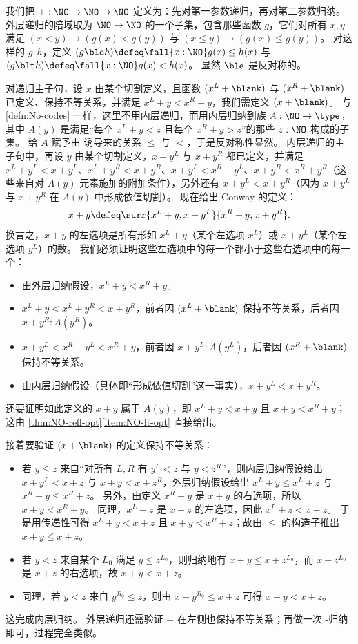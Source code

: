 \begin{eg}\label{eg:surreal-addition}
%
我们把 $\mathord+:\NO\to\NO\to\NO$ 定义为：先对第一参数递归，再对第二参数归纳。
外层递归的陪域取为 $\NO\to\NO$ 的一个子集，包含那些函数 $g$，它们对所有 $x,y$ 满足 $(x<y) \to (g(x)<g(y))$ 与 $(x\le y) \to (g(x)\le g(y))$。
对这样的 $g,h$，定义 $(g\ble h)\defeq \fall{x:\NO} g(x)\le h(x)$ 与 $(g\blt h)\defeq \fall{x:\NO} g(x)< h(x)$。
显然 $\ble$ 是反对称的。

对递归主子句，设 $x$ 由某个切割定义，且函数 $(x^L+\blank)$ 与 $(x^R+\blank)$ 已定义、保持不等关系，并满足 $x^L+y<x^R+y$，我们需定义 $(x+\blank)$。
与 \cref{defn:No-codes} 一样，这里不用内层递归，而用内层归纳到族 $A:\NO\to\type$，其中 $A(y)$ 是满足“每个 $x^L + y < z$ 且每个 $x^R + y > z$”的那些 $z:\NO$ 构成的子集。
给 $A$ 赋予由 \NO 诱导来的关系 $\le$ 与 $<$，于是反对称性显然。
内层递归的主子句中，再设 $y$ 由某个切割定义，$x+y^L$ 与 $x+y^R$ 都已定义，并满足 $x^L+y^L < x+y^L$、$x^L+y^R < x+y^R$、$x+y^L < x^R + y^L$、$x+y^R < x^R+y^R$（这些来自对 $A(y)$ 元素施加的附加条件），另外还有 $x+y^L < x+y^R$（因为 $x+y^L$ 与 $x+y^R$ 在 $A(y)$ 中形成依值切割）。
现在给出 Conway 的定义：
\[ x+y \defeq \surr{x^L+y, x+y^L}{x^R+y,x+y^R}. \]
换言之，$x+y$ 的左选项是所有形如 $x^L+y$（某个左选项 $x^L$）或 $x+y^L$（某个左选项 $y^L$）的数。
我们必须证明这些左选项中的每一个都小于这些右选项中的每一个：
\begin{itemize}
\item 由外层归纳假设，$x^L+y < x^R+y$。
\item $x^L+y < x^L + y^R < x + y^R$，前者因 $(x^L+\blank)$ 保持不等关系，后者因 $x+y^R : A(y^R)$。
\item $x+y^L < x^R+ y^L < x^R + y$，前者因 $x+y^L : A(y^L)$，后者因 $(x^R+\blank)$ 保持不等关系。
\item 由内层归纳假设（具体即“形成依值切割”这一事实），$x+y^L < x+y^R$。
\end{itemize}
还要证明如此定义的 $x+y$ 属于 $A(y)$，即 $x^L + y < x+y$ 且 $x+y < x^R + y$；这由 \cref{thm:NO-refl-opt}\ref{item:NO-lt-opt} 直接给出。

接着要验证 $(x+\blank)$ 的定义保持不等关系：
\begin{itemize}
\item 若 $y\le z$ 来自“对所有 $L,R$ 有 $y^L<z$ 与 $y<z^R$”，则内层归纳假设给出 $x+y^L<x+z$ 与 $x+y < x+z^R$，外层归纳假设给出 $x^L+y \le x^L+z$ 与 $x^R+ y \le x^R+z$。
  另外，由定义 $x^R+y$ 是 $x+y$ 的右选项，所以 $x+y < x^R+y$。
  同理，$x^L+z$ 是 $x+z$ 的左选项，因此 $x^L+z < x+z$。
  于是用传递性可得 $x^L+y < x+z$ 且 $x+y < x^R+z$；故由 $\le$ 的构造子推出 $x+y \le x+z$。
\item 若 $y<z$ 来自某个 $L_0$ 满足 $y\le z^{L_0}$，则归纳地有 $x+y \le x+z^{L_0}$，而 $x+z^{L_0}$ 是 $x+z$ 的右选项，故 $x+y<x+z$。
\item 同理，若 $y<z$ 来自 $y^{R_0}\le z$，则由 $x+y^{R_0}\le x+z$ 可得 $x+y<x+z$。
\end{itemize}
这完成内层归纳。
外层递归还需验证 $+$ 在左侧也保持不等关系；再做一次 \NO-归纳即可，过程完全类似。
\end{eg}

